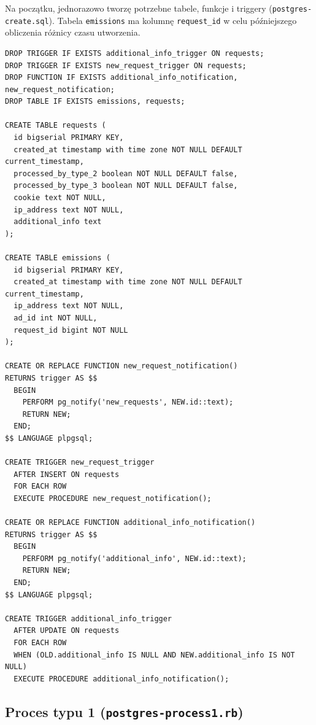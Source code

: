 \documentclass[a4paper,11pt]{article}
\begin{document}
Na początku, jednorazowo tworzę potrzebne tabele, funkcje i triggery (\texttt{postgres-create.sql}).
Tabela \texttt{emissions} ma kolumnę \texttt{request\_id} w celu późniejszego obliczenia różnicy czasu
utworzenia.
\begin{lstlisting}
DROP TRIGGER IF EXISTS additional_info_trigger ON requests;
DROP TRIGGER IF EXISTS new_request_trigger ON requests;
DROP FUNCTION IF EXISTS additional_info_notification, new_request_notification;
DROP TABLE IF EXISTS emissions, requests;

CREATE TABLE requests (
  id bigserial PRIMARY KEY,
  created_at timestamp with time zone NOT NULL DEFAULT current_timestamp,
  processed_by_type_2 boolean NOT NULL DEFAULT false,
  processed_by_type_3 boolean NOT NULL DEFAULT false,
  cookie text NOT NULL,
  ip_address text NOT NULL,
  additional_info text
);

CREATE TABLE emissions (
  id bigserial PRIMARY KEY,
  created_at timestamp with time zone NOT NULL DEFAULT current_timestamp,
  ip_address text NOT NULL,
  ad_id int NOT NULL,
  request_id bigint NOT NULL
);

CREATE OR REPLACE FUNCTION new_request_notification()
RETURNS trigger AS $$
  BEGIN
    PERFORM pg_notify('new_requests', NEW.id::text);
    RETURN NEW;
  END;
$$ LANGUAGE plpgsql;

CREATE TRIGGER new_request_trigger
  AFTER INSERT ON requests
  FOR EACH ROW
  EXECUTE PROCEDURE new_request_notification();

CREATE OR REPLACE FUNCTION additional_info_notification()
RETURNS trigger AS $$
  BEGIN
    PERFORM pg_notify('additional_info', NEW.id::text);
    RETURN NEW;
  END;
$$ LANGUAGE plpgsql;

CREATE TRIGGER additional_info_trigger
  AFTER UPDATE ON requests
  FOR EACH ROW
  WHEN (OLD.additional_info IS NULL AND NEW.additional_info IS NOT NULL)
  EXECUTE PROCEDURE additional_info_notification();
\end{lstlisting}


\subsection{Proces typu 1 (\texttt{postgres-process1.rb})}
\end{document}
